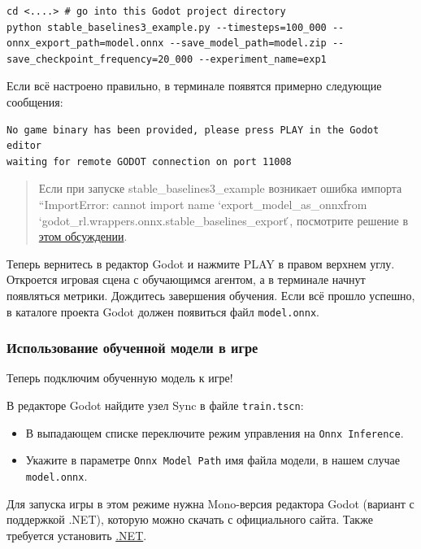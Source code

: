 \documentclass[11pt,a4paper]{article}
\begin{document}
\begin{lstlisting}
cd <....> # go into this Godot project directory
python stable_baselines3_example.py --timesteps=100_000 --onnx_export_path=model.onnx --save_model_path=model.zip --save_checkpoint_frequency=20_000 --experiment_name=exp1
\end{lstlisting}

Если всё настроено правильно, в терминале появятся примерно следующие сообщения:

\begin{lstlisting}
No game binary has been provided, please press PLAY in the Godot editor
waiting for remote GODOT connection on port 11008
\end{lstlisting}

\begin{quote}\raggedright
Если при запуске stable\_baselines3\_example возникает ошибка импорта ``ImportError: cannot import name `export\_model\_as\_onnx\' from `godot\_rl.wrappers.onnx.stable\_baselines\_export\'\,, посмотрите решение в \href{https://github.com/edbeeching/godot_rl_agents/issues/203}{этом обсуждении}.
\end{quote}

Теперь вернитесь в редактор Godot и нажмите PLAY в правом верхнем углу. Откроется игровая сцена с обучающимся агентом, а в терминале начнут появляться метрики. Дождитесь завершения обучения. Если всё прошло успешно, в каталоге проекта Godot должен появиться файл \texttt{model.onnx}.

\subsubsection{Использование обученной модели в игре}\label{apply-ai-in-the-game}

Теперь подключим обученную модель к игре!

В редакторе Godot найдите узел Sync в файле \texttt{train.tscn}:

\begin{itemize}
\item
  В выпадающем списке переключите режим управления на \texttt{Onnx\ Inference}.
\item
  Укажите в параметре \texttt{Onnx\ Model\ Path} имя файла модели, в нашем случае \texttt{model.onnx}.
\end{itemize}

Для запуска игры в этом режиме нужна Mono-версия редактора Godot (вариант с поддержкой .NET), которую можно скачать с официального сайта. Также требуется установить \href{https://dotnet.microsoft.com/en-us/download}{.NET}.
\end{document}
